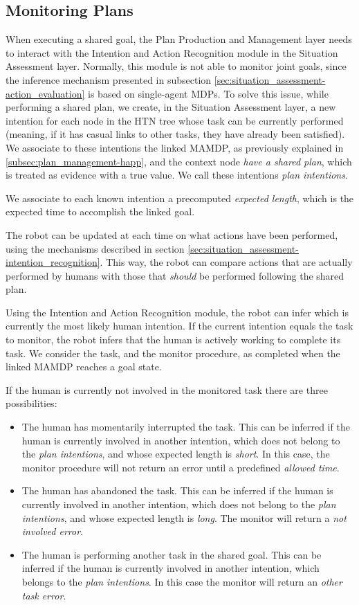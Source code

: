\subsection{Monitoring Plans}
When executing a shared goal, the Plan Production and Management layer needs to interact with the Intention and Action Recognition module in the Situation Assessment layer. Normally, this module is not able to monitor joint goals, since the inference mechanism presented in subsection \ref{sec:situation_assessment-action_evaluation} is based on single-agent MDPs. To solve this issue, while performing a shared plan, we create, in the Situation Assessment layer, a new intention for each node in the HTN tree whose task can be currently performed (meaning, if it has casual links to other tasks, they have already been satisfied). We associate to these intentions the linked MAMDP, as previously explained in \ref{subsec:plan_management-happ},
 and the context node \textit{have a shared plan}, which is treated as evidence with a true value. We call these intentions \textit{plan intentions}.

We associate to each known intention a precomputed \textit{expected length}, which is the expected time to accomplish the linked goal.

The robot can be updated at each time on what actions have been performed, using the mechanisms described in section \ref{sec:situation_assessment-intention_recognition}. This way, the robot can compare actions that are actually performed by humans with those that \textit{should} be performed following the shared plan.

Using the Intention and Action Recognition module, the robot can infer which is currently the most likely human intention. If the current intention equals the task to monitor, the robot infers that the human is actively working to complete its task. We consider the task, and the monitor procedure, as completed when the linked MAMDP reaches a goal state.

If the human is currently not involved in the monitored task there are three possibilities:
\begin{itemize}
	\item The human has momentarily interrupted the task. This can be inferred if the human is currently involved in another intention, which does not belong to the \textit{plan intentions}, and whose expected length is \textit{short}. In this case, the monitor procedure will not return an error until a predefined \textit{allowed time}.
	\item The human has abandoned the task.  This can be inferred if the human is currently involved in another intention, which does not belong to the \textit{plan intentions}, and whose expected length is \textit{long}. The monitor will return a \textit{not involved error}. 
	\item The human is performing another task in the shared goal. This can be inferred if the human is currently involved in another intention, which belongs to the \textit{plan intentions}. In this case the monitor will return an \textit{other task error}. 
\end{itemize}


